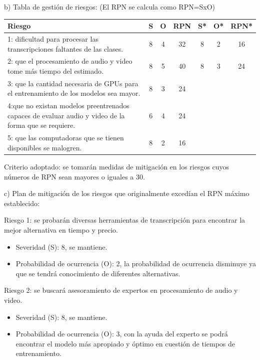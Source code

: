 \documentclass[
11pt, %
codirector, %
]{charter}
\begin{document}
b) Tabla de gestión de riesgos:      (El RPN se calcula como RPN=SxO)

\begin{table}[htpb]
\centering
\begin{tabularx}{\linewidth}{@{}|X|c|c|c|c|c|c|@{}}
\hline
\rowcolor[HTML]{C0C0C0} 
Riesgo & S & O & RPN & S* & O* & RPN* \\ \hline
      1: dificultad para procesar las transcripciones faltantes de las clases. &  8 &  4 &   32 &  8 &  2 & 16   \\ \hline
      2: que el procesamiento de audio y video tome más tiempo del estimado. &  8 &  5 &   40 &  8 &  3 & 24   \\ \hline
      3: que la cantidad necesaria de GPUs para el entrenamiento de los modelos sea mayor. &  8 &  3 &   24 &   &   &     \\ \hline
      4:que no existan modelos preentrenados capaces de evaluar audio y video de la forma que se requiere. &  6 &  4 &   24 &    &    &      \\ \hline
      5: que las computadoras que se tienen disponibles se malogren. &  8 &  2 &   16 &    &    &      \\ \hline
\end{tabularx}%
\end{table}

Criterio adoptado: 
se tomarán medidas de mitigación en los riesgos cuyos números de RPN sean mayores o iguales a 30.

c) Plan de mitigación de los riesgos que originalmente excedían el RPN máximo establecido:
 
Riesgo 1: se probarán diversas herramientas de transcripción para encontrar la mejor alternativa en tiempo y precio.
\begin{itemize}
  \item Severidad (S): 8, se mantiene.
  \item Probabilidad de ocurrencia (O): 2, la probabilidad de ocurrencia disminuye ya que se tendrá conocimiento de diferentes alternativas.
\end{itemize}

Riesgo 2: se buscará asesoramiento de expertos en procesamiento de audio y video.
\begin{itemize}
  \item Severidad (S): 8, se mantiene.
  \item Probabilidad de ocurrencia (O): 3, con la ayuda del experto se podrá encontrar el modelo más apropiado y óptimo en cuestión de tiempos de entrenamiento.
\end{itemize}
 
\end{document}
